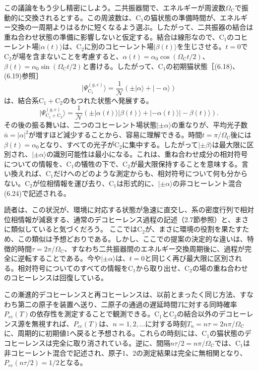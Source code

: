 この議論をもう少し精密にしよう。二共振器間で、エネルギーが周波数$\Omega_{\mathrm C}$で振動的に交換されるとする。この周波数は、$\mathrm C_1$の猫状態の準備時間が、エネルギー交換の一周期よりはるかに短くなるよう選ぶ。したがって、二共振器の結合は重ね合わせ状態の準備に影響しないと仮定する。結合は線形なので、$\mathrm C_1$のコヒーレント場$|\alpha(t)\rangle$は、$\mathrm C_2$に別のコヒーレント場$|\beta(t)\rangle$を生じさせる。$t=0$で$\mathrm C_2$が場を含まないことを考慮すると、$\alpha(t)=\alpha_0\cos(\Omega_{\mathrm C}t/2)$、$\beta(t)=\alpha_0\sin(\Omega_{\mathrm C}t/2)$と書ける。したがって、$\mathrm C_1$の初期猫状態［(6.18)、(6.19)参照］
\begin{equation}|\Psi_{\mathrm C_1}^{(g,e)}\rangle=\frac1{\mathcal N}(\pm|\alpha\rangle+|-\alpha\rangle)\tag{6.27}\end{equation}
は、結合系$\mathrm C_1+\mathrm C_2$のもつれた状態へ発展する。
\begin{equation}|\Psi_{\mathrm C_1+\mathrm C_2}^{(g,e)}\rangle=\frac1{\mathcal N}(\pm|\alpha(t)\rangle|\beta(t)\rangle+|-\alpha(t)\rangle|-\beta(t)\rangle).\tag{6.28}\end{equation}
その後の振る舞いは、二つのコヒーレント場状態$|\pm\alpha\rangle$の重なりが、平均光子数$\bar n=|\alpha|^2$が増すほど減少することから、容易に理解できる。時間$t=\pi/\Omega_{\mathrm C}$後には$\beta(t)=\alpha_0$となり、すべての光子が$\mathrm C_2$に集中する。したがって$|\pm\beta\rangle$は最大限に区別され、$|\pm\alpha\rangle$の識別可能性は最小になる。これは、重ね合わせ成分の相対符号についての情報を、$\mathrm C_1$の犠牲の下で、$\mathrm C_2$が最大限保持することを意味する。言い換えれば、$\mathrm C_1$だけへのどのような測定からも、相対符号について何も分からない。$\mathrm C_2$が位相情報を運び去り、$\mathrm C_1$は形式的に、$|\pm\alpha\rangle$の非コヒーレント混合(6.24)で記述される。

読者は、この状況が、環境に対応する状態が急速に直交し、系の密度行列で相対位相情報が減衰する、通常のデコヒーレンス過程の記述（2.7節参照）と、まさに類似していると気づくだろう。
\hypertarget{srcpage:257}{}\label{srcpage:257}
ここでは$\mathrm C_2$が、まさに環境の役割を果たすため、この類似は予想どおりである。しかし、ここでの提案の決定的な違いは、特徴的時間$\tau=2\pi/\Omega_{\mathrm C}$、すなわち二共振器間のエネルギー交換周期後に、過程が完全に逆転することである。今や$|\pm\alpha\rangle$は、$t=0$と同じく再び最大限に区別される。相対符号についてのすべての情報を$\mathrm C_1$から取り出せ、$\mathrm C_2$の場の重ね合わせのコヒーレンスは回復している。

この漸進的デコヒーレンスと再コヒーレンスは、以前とまったく同じ方法、すなわち第二の原子を装置へ送り、二原子の通過の遅延時間$T$に対する同時確率$P_{ee}(T)$の依存性を測定することで観測できる。$\mathrm C_1$と$\mathrm C_2$の結合以外のデコヒーレンス源を無視すれば、$P_{ee}(T)$は、$n=1,2,\ldots$に対する時刻$T_n=n\tau=2n\pi/\Omega_{\mathrm C}$に、周期的に初期値1へ戻ると予想される。これらの時刻には、$\mathrm C_1$の猫状態のデコヒーレンスは完全に取り消されている。逆に、間隔$n\tau/2=n\pi/\Omega_{\mathrm C}$では、$\mathrm C_1$は非コヒーレント混合で記述され、原子1、2の測定結果は完全に無相関となり、$P_{ee}(n\tau/2)=1/2$となる。

